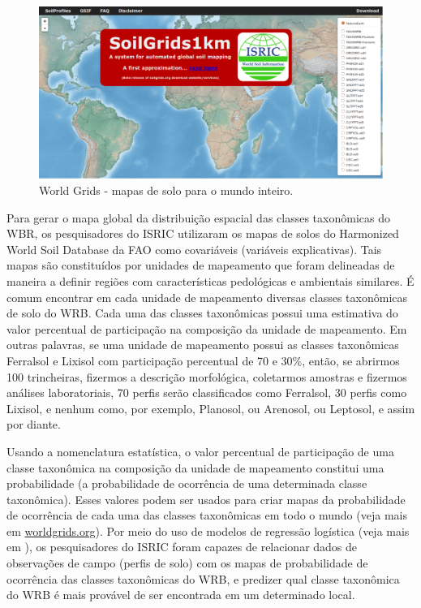\begin{figure}[tb!]
\begin{minipage}[t]{1\linewidth}
\begin{center}
 \includegraphics[width=\textwidth]{figuras/worldgrids}
 \caption{World Grids - mapas de solo para o mundo inteiro.}
 \label{fig:worldgrids}
\end{center}
\end{minipage}
\end{figure}




Para gerar o mapa global da distribuição espacial das classes taxonômicas do WBR, os pesquisadores do ISRIC utilizaram os mapas de solos do Harmonized World Soil Database da FAO \citep{Fao2012} como covariáveis (variáveis explicativas). Tais mapas são constituídos por unidades de mapeamento que foram delineadas de maneira a definir regiões com características pedológicas e ambientais similares. É comum encontrar em cada unidade de mapeamento diversas classes taxonômicas de solo do WRB. Cada uma das classes taxonômicas possui uma estimativa do valor percentual de participação na composição da unidade de mapeamento. Em outras palavras, se uma unidade de mapeamento possui as classes taxonômicas Ferralsol e Lixisol com participação percentual de 70 e 30\%, então, se abrirmos 100 trincheiras, fizermos a descrição morfológica, coletarmos amostras e fizermos análises laboratoriais, 70 perfis serão classificados como Ferralsol, 30 perfis como Lixisol, e nenhum como, por exemplo, Planosol, ou Arenosol, ou Leptosol, e assim por diante.




Usando a nomenclatura estatística, o valor percentual de participação de uma classe taxonômica na composição da unidade de mapeamento constitui uma probabilidade (a probabilidade de ocorrência de uma determinada classe taxonômica). Esses valores podem ser usados para criar mapas da probabilidade de ocorrência de cada uma das classes taxonômicas em todo o mundo (veja mais em \url{worldgrids.org}). Por meio do uso de modelos de regressão logística (veja mais em \cite{tenCatenEtAl2011}), os pesquisadores do ISRIC foram capazes de relacionar dados de observações de campo (perfis de solo) com os mapas de probabilidade de ocorrência das classes taxonômicas do WRB, e predizer qual classe taxonômica do WRB é mais provável de ser encontrada em um determinado local.




